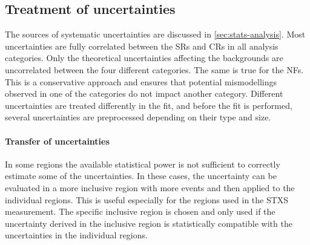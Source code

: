 \subsection{Treatment of uncertainties}
The sources of systematic uncertainties are discussed in \cref{sec:stats-analysis}. 
Most uncertainties are fully correlated between the SRs and CRs in all analysis categories. Only the theoretical uncertainties affecting the backgrounds are uncorrelated between the four different categories. The same is true for the NFs. This is a conservative approach and ensures that potential mismodellings observed in one of the categories do not impact another category. 
Different uncertainties are treated differently in the fit, and before the fit is performed, several uncertainties are preprocessed depending on their type and size. 

\paragraph{Transfer of uncertainties}
In some regions the available statistical power is not sufficient to correctly estimate some of the uncertainties. 
In these cases, the uncertainty can be evaluated in a more inclusive region with more events and then applied to the individual regions. This is useful especially for the regions used in the STXS measurement. The specific inclusive region is chosen and only used if the uncertainty derived in the inclusive region is statistically compatible with the uncertainties in the individual regions. 


